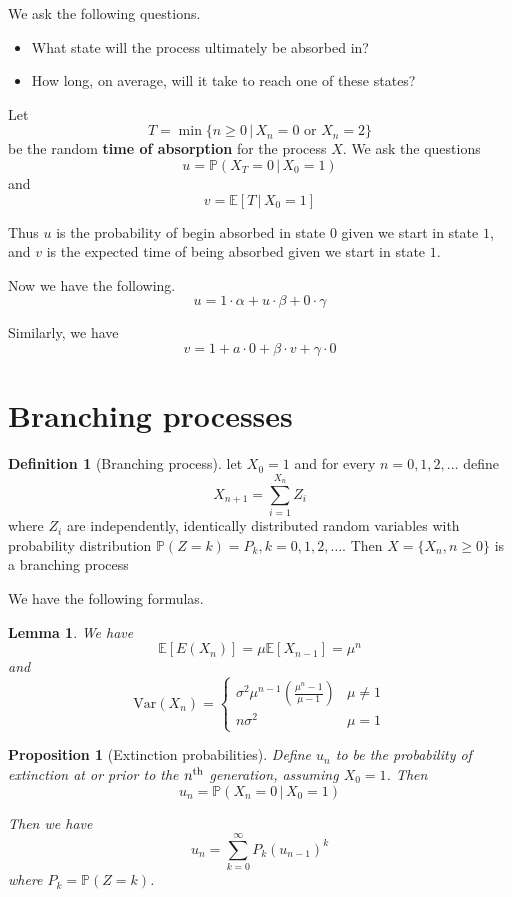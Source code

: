 \documentclass[10pt, oneside, reqno]{amsart}
\theoremstyle{plain}%
\newtheorem{lem}[thm]{Lemma}
\newtheorem{prop}[thm]{Proposition}
\theoremstyle{definition}
\newtheorem{defn}[thm]{Definition}
\theoremstyle{remark}
\newcommand{\expc}[1]{\mathbb{E}\left[#1\right]}
\newcommand{\var}[1]{\text{Var}\left(#1\right)}
\newcommand{\prob}[1]{\mathbb{P}(#1)}
\newcommand{\given}{ \, | \,}
\newcommand{\nth}{n\textsuperscript{th}}
\begin{document}
We ask the following questions.
\begin{itemize}
    \item What state will the process ultimately be absorbed in?
    \item How long, on average, will it take to reach one of these states?
\end{itemize}

Let \[T = \min \{n \geq 0 \given X_n = 0 \text{ or } X_n = 2 \}\]
be the random \textbf{time of absorption} for the process $X$.  We ask the questions \[
    u = \prob{X_T = 0 \given X_0 = 1} 
\] and \[
    v = \expc{T \given X_0 = 1}
\]

Thus $u$ is the probability of begin absorbed in state $0$ given we start in state $1$, and $v$ is the expected time of being absorbed given we start in state $1$.

Now we have the following.\[
    u = 1\cdot \alpha + u \cdot \beta + 0 \cdot \gamma
\]

Similarly, we have 
\[
    v = 1 + a \cdot 0 + \beta \cdot v + \gamma \cdot 0
\]


\section{Branching processes} %
\label{sub:branching_processes}

\begin{defn}[Branching process]
    let $X_0 = 1$ and for every $n = 0,1,2,\dots$ define\[
        X_{n+1} = \sum_{i=1}^{X_n} Z_i
    \]
    where $Z_i$ are independently, identically distributed random variables with probability distribution $\prob{Z=k} = P_k, k = 0,1,2,\dots$.  Then $X = \{ X_n, n \geq 0 \}$ is a branching process
\end{defn}

We have the following formulas.

\begin{lem}
    We have \[
        \expc{E(X_n)} = \mu \expc{X_{n-1}} = \mu^n
    \]
and \[
    \var{X_n} = \begin{cases}
        \sigma^2 \mu^{n-1} \left( \frac{\mu^n - 1}{\mu - 1}\right) &\mu \neq 1 \\
        n \sigma^2 &\mu = 1
    \end{cases}
\]
\end{lem}

\begin{prop}[Extinction probabilities]
    Define $u_n$ to be the probability of extinction at or prior to the $\nth$ generation, assuming $X_0 = 1$.  Then \[
        u_n = \prob{X_n = 0 \given X_0 = 1}
    \]

Then we have \[
    u_n = \sum_{k=0}^\infty P_k (u_{n-1})^k
\] where $P_k = \prob{Z = k}$.
\end{prop}
\end{document}
